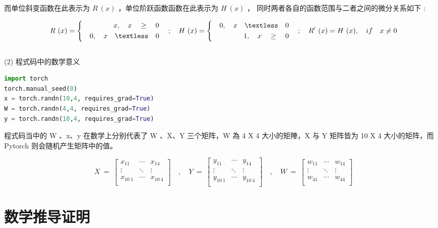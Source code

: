 \documentclass[11pt,UTF8]{ctexart}
\begin{document}
而单位斜变函数在此表示为 $R\ (x)$ ，单位阶跃函数函数在此表示为 $H\ (x)$ ，
同时两者各自的函数范围与二者之间的微分关系如下 :

$$ R\ (x)=\left\{
\begin{aligned}
\quad x,\quad x\quad\geq\quad0 \\
\quad 0,\quad x\quad\textless\quad0 \\
\end{aligned}
\right.
\quad; \quad 
H\ (x)=\left\{
\begin{aligned}
\quad 0,\quad x\quad\textless\quad 0 \\
\quad 1,\quad x\quad\geq\quad 0 \\
\end{aligned}
\right.
\quad; \quad 
 R'\ (x)=  H\ (x),\quad if\quad x \neq 0
$$
\\
(2) 程式码中的数学意义
\\
	\begin{lstlisting}[language={python}]
import torch
torch.manual_seed(0)
x = torch.randn(10,4, requires_grad=True)
W = torch.randn(4,4, requires_grad=True)
y = torch.randn(10,4, requires_grad=True)
	\end{lstlisting}

程式码当中的 W 、x、y 在数学上分别代表了 W 、X、Y 三个矩阵，W 為 4 X 4 大小的矩陣，X 与 Y 矩阵皆为 10 X 4 大小的矩阵，而 Pytorch 则会随机产生矩阵中的值。

$$X\ =\ \left[\begin{matrix}x_{11}&\cdots&x_{14}\\\vdots&\ddots&\vdots\\x_{10\ 1}&\cdots&x_{10\ 4}\\\end{matrix}\right]\quad, \quad Y\ =\ \left[\begin{matrix}y_{11}&\cdots&y_{14}\\\vdots&\ddots&\vdots\\y_{10\ 1}&\cdots&y_{10\ 4}\\\end{matrix}\right]\quad, \quad W\ =\ \left[\begin{matrix}w_{11}&\cdots&w_{14}\\\vdots&\ddots&\vdots\\w_{41}&\cdots&w_{44}\\\end{matrix}\right]$$

\newpage

\section{数学推导证明}
\end{document}

